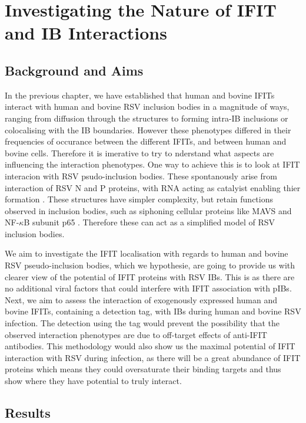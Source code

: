 \chapter{Investigating the Nature of IFIT and IB Interactions} \label{ch:Investigating the Nature of IFIT and IB Interactions}
\section{Background and Aims} \label{sec:Background and Aims-Chapter4}
In the previous chapter, we have established that human and bovine IFITs interact with human and bovine RSV inclusion bodies in a magnitude of ways, ranging from diffusion through the structures to forming intra-IB inclusions or colocalising with the IB boundaries. However these phenotypes differed in their frequencies of occurance between the different IFITs, and between human and bovine cells. Therefore it is imerative to try to nderstand what aspects are influencing the interaction phenotypes. One way to achieve this is to look at IFIT interacion with RSV psudo-inclusion bodies. These spontanously arise from interaction of RSV N and P proteins, with RNA acting as catalyist enabling thier formation \cite{Rincheval2017FunctionalVirus, Galloux2020MinimalVitro}. These structures have simpler complexity, but retain functions observed in inclusion bodies, such as siphoning cellular proteins like MAVS and NF-\(\kappa\)B subunit p65 \cite{Rincheval2017FunctionalVirus, Jobe2023ViralCondensates}. Therefore these can act as a simplified model of RSV inclusion bodies.

We aim to investigate the IFIT localisation with regards to human and bovine RSV pseudo-inclusion bodies, which we hypothesie, are going to provide us with clearer view of the potential of IFIT proteins with RSV IBs. This is as there are no additional viral factors that could interfere with IFIT association with pIBs. Next, we aim to assess the interaction of exogenously expressed human and bovine IFITs, containing a detection tag, with IBs during human and bovine RSV infection. The detection using the tag would prevent the possibility that the observed interaction phenotypes are due to off-target effects of anti-IFIT antibodies. This methodology would also show us the maximal potential of IFIT interaction with RSV during infection, as there will be a great abundance of IFIT proteins which means they could oversaturate their binding targets and thus show where they have potential to truly interact. 

\section{Results} \label{sec:Results-Chapter4}



